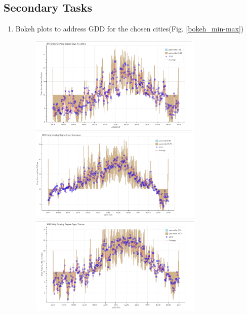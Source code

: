 \documentclass{article}
\begin{document}
\subsection{ \bf Secondary Tasks }
\begin{enumerate}
\item Bokeh plots to address GDD for the  chosen cities(Fig. \ref{bokeh_min-max})
\begin{center}
\begin{figure}[H] 
\includegraphics[width=3.25in]{secTask-1St_Johns.png}\\

\includegraphics[width=3.25in]{secTask-1Vancouver.png}\\

\includegraphics[width=3.25in]{secTask-1Toronto.png}\\


\end{figure}
\end{center}
\end{enumerate}
\end{document}
